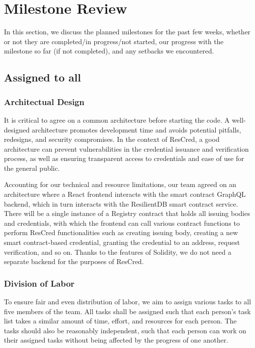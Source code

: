 \section{Milestone Review}
In this section, we discuss the planned milestones for the past few weeks, whether or not they are completed/in progress/not started, our progress with the milestone so far (if not completed), and any setbacks we encountered.

\subsection{Assigned to all}

\subsubsection{Architectual Design}

It is critical to agree on a common architecture before starting the code. A well-designed architecture promotes development time and avoids potential pitfalls, redesigns, and security compromises. In the context of ResCred, a good architecture can prevent vulnerabilities in the credential issuance and verification process, as well as ensuring transparent access to credentials and ease of use for the general public.

Accounting for our technical and resource limitations, our team agreed on an architecture where a React frontend interacts with the smart contract GraphQL backend, which in turn interacts with the ResilientDB smart contract service. There will be a single instance of a Registry contract that holds all issuing bodies and credentials, with which the frontend can call various contract functions to perform ResCred functionalities such as creating issuing body, creating a new smart contract-based credential, granting the credential to an address, request verification, and so on. Thanks to the features of Solidity, we do not need a separate backend for the purposes of ResCred.

\subsubsection{Division of Labor}

To ensure fair and even distribution of labor, we aim to assign various tasks to all five members of the team. All tasks shall be assigned such that each person’s task list takes a similar amount of time, effort, and resources for each person. The tasks should also be reasonably independent, such that each person can work on their assigned tasks without being affected by the progress of one another.

